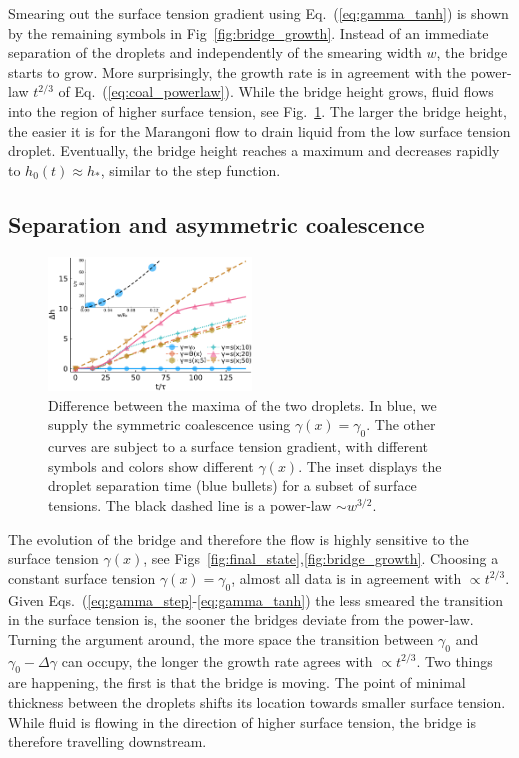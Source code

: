 \documentclass[twocolumn,amsmath,amssymb,showpacs,nofootinbib,prfluids,superscriptaddress]{revtex4-2} %
\begin{document}
Smearing out the surface tension gradient using Eq.~(\ref{eq:gamma_tanh}) is shown by the remaining symbols in Fig~\ref{fig:bridge_growth}.
Instead of an immediate separation of the droplets and independently of the smearing width $w$, the bridge starts to grow.
More surprisingly, the growth rate is in agreement with the power-law $t^{2/3}$ of Eq.~(\ref{eq:coal_powerlaw}).
While the bridge height grows, fluid flows into the region of higher surface tension, see Fig.~\ref{fig:drop_diff}.
The larger the bridge height, the easier it is for the Marangoni flow to drain liquid from the low surface tension droplet.
Eventually, the bridge height reaches a maximum and decreases rapidly to $h_0(t) \approx h_{\ast}$, similar to the step function.

\subsection{Separation and asymmetric coalescence}\label{subsec:separation}
\begin{figure}
    \centering
    \includegraphics[width=0.48\textwidth]{Figures/hdiff_inset.pdf}
    \caption{Difference between the maxima of the two droplets.
    In blue, we supply the symmetric coalescence using $\gamma(x) = \gamma_0$.
    The other curves are subject to a surface tension gradient, with different symbols and colors show different $\gamma(x)$.
    The inset displays the droplet separation time (blue bullets) for a subset of surface tensions.
    The black dashed line is a power-law $\sim w^{3/2}$.
    }
    \label{fig:drop_diff}
\end{figure}
The evolution of the bridge and therefore the flow is highly sensitive to the surface tension $\gamma(x)$, see Figs~\ref{fig:final_state},\ref{fig:bridge_growth}.
Choosing a constant surface tension $\gamma(x) = \gamma_0$, almost all data is in agreement with $\propto t^{2/3}$.
Given Eqs.~(\ref{eq:gamma_step}-\ref{eq:gamma_tanh}) the less smeared the transition in the surface tension is, the sooner the bridges deviate from the power-law.
Turning the argument around, the more space the transition between $\gamma_0$ and $\gamma_0-\Delta\gamma$ can occupy, the longer the growth rate agrees with $\propto t^{2/3}$.
Two things are happening, the first is that the bridge is moving.
The point of minimal thickness between the droplets shifts its location towards smaller surface tension.
While fluid is flowing in the direction of higher surface tension, the bridge is therefore travelling downstream.
\end{document}

